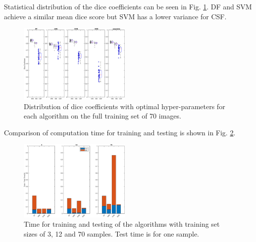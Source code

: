 \documentclass[journal]{IEEEtran}
\begin{document}
Statistical distribution of the dice coefficients can be seen in Fig. \ref{f.boxplot}. DF and SVM achieve a similar mean dice score but SVM has a lower variance for CSF.
\begin{figure}
	\centering
	\includegraphics[width=0.48\textwidth]{images/boxplot}
	\caption{Distribution of dice coefficients with optimal hyper-parameters for each algorithm on the full training set of 70 images.}\label{f.boxplot}
\end{figure}

Comparison of computation time for training and testing is shown in Fig. \ref{f.runtimebarplot}.
\begin{figure}
	\centering
	\includegraphics[width=0.48\textwidth]{images/runtimes}
	\caption{Time for training and testing of the algorithms with training set sizes of 3, 12 and 70 samples. Test time is for one sample.}\label{f.runtimebarplot}
\end{figure}
\end{document}
